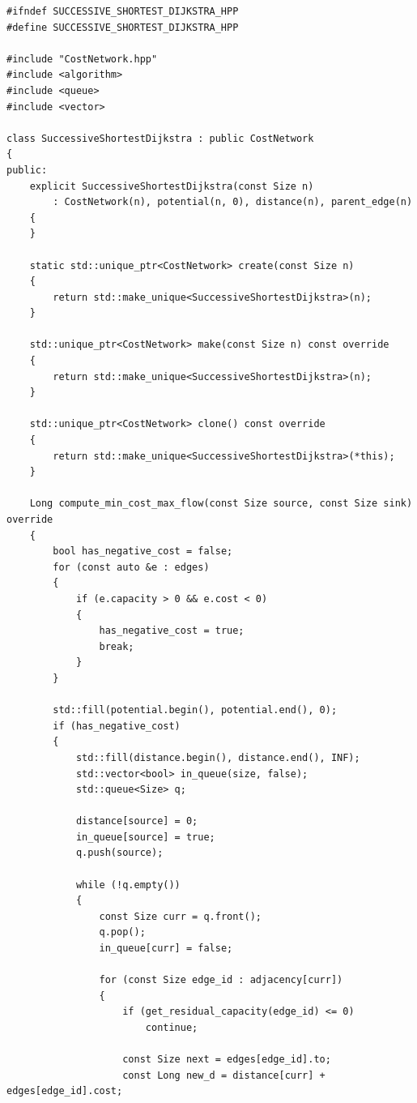 \documentclass[12pt,a4paper]{article}
\begin{document}
\newpage

\label{ap:successive_shortest_dijkstra}

\begin{lstlisting}[caption={Implementação em C++ do algoritmo \textit{Successive Shortest Path} com Potenciais Nodais e Dijkstra.}, label={lst:successive_shortest_dijkstra}]
#ifndef SUCCESSIVE_SHORTEST_DIJKSTRA_HPP
#define SUCCESSIVE_SHORTEST_DIJKSTRA_HPP

#include "CostNetwork.hpp"
#include <algorithm>
#include <queue>
#include <vector>

class SuccessiveShortestDijkstra : public CostNetwork
{
public:
	explicit SuccessiveShortestDijkstra(const Size n)
	    : CostNetwork(n), potential(n, 0), distance(n), parent_edge(n)
	{
	}

	static std::unique_ptr<CostNetwork> create(const Size n)
	{
		return std::make_unique<SuccessiveShortestDijkstra>(n);
	}

	std::unique_ptr<CostNetwork> make(const Size n) const override
	{
		return std::make_unique<SuccessiveShortestDijkstra>(n);
	}

	std::unique_ptr<CostNetwork> clone() const override
	{
		return std::make_unique<SuccessiveShortestDijkstra>(*this);
	}

	Long compute_min_cost_max_flow(const Size source, const Size sink) override
	{
		bool has_negative_cost = false;
		for (const auto &e : edges)
		{
			if (e.capacity > 0 && e.cost < 0)
			{
				has_negative_cost = true;
				break;
			}
		}

		std::fill(potential.begin(), potential.end(), 0);
		if (has_negative_cost)
		{
			std::fill(distance.begin(), distance.end(), INF);
			std::vector<bool> in_queue(size, false);
			std::queue<Size> q;

			distance[source] = 0;
			in_queue[source] = true;
			q.push(source);

			while (!q.empty())
			{
				const Size curr = q.front();
				q.pop();
				in_queue[curr] = false;

				for (const Size edge_id : adjacency[curr])
				{
					if (get_residual_capacity(edge_id) <= 0)
						continue;

					const Size next = edges[edge_id].to;
					const Long new_d = distance[curr] + edges[edge_id].cost;


\end{lstlisting}
\end{document}

